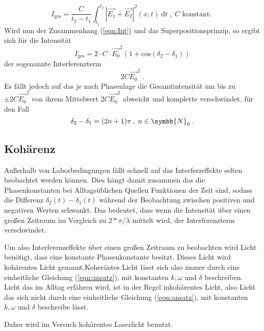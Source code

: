 \begin{equation}
    I_\text{ges} = \frac{C}{t_2 - t_1} \int^{t_2}_{t_1} |\vec{E_1} + \vec{E_2}|^2 (x, t) \: \text{d}t 
    \; , \; C \text{ konstant. } 
\end{equation}
\noindent
Wird nun der Zusammenhang (\ref{eqn:Int}) und das Superpositionsprinzip, so ergibt sich für die Intensität 
\begin{equation*}
    I_\text{ges} = 2 \cdot C \cdot \vec{E_0}^2 (1 + \text{cos}(\delta_2 - \delta_1))
\end{equation*}
\noindent 
der sogenannte Interferenzterm 
\begin{equation*}
    2 C \vec{E_0}^2 \; .
\end{equation*}
\noindent 
Es fällt jedoch auf das je nach Phasenlage die Gesamtintensität um bis zu $\pm 2 C \vec{E_0}^2$ von ihrem Mittelwert $2 C \vec{E_0}^2$ abweicht und komplette verschwindet, für
den Fall 
\begin{equation}
    \delta_2 - \delta_1 = (2n + 1)\pi \: , \; n \in \symbb{N}_0 \; .
\end{equation}

\subsection{Kohärenz}
Außerhalb von Laborbedingungen fällt schnell auf das Interferzeffekte selten beobachtet werden können. Dies hängt damit zusammen das die Phasenkonstanten bei Alltagsüblichen Quellen 
Funktionen der Zeit sind, sodass die Differenz $\delta_2(t) - \delta_1(t)$ während der Beobachtung zwischen positiven und negativen Werten schwankt. Das bedeutet, dass wenn die
Intensität über einen großen Zeitraum im Vergleich zu $2*\pi/\lambda$ mittelt wird, der Interferenzterm verschwindet.

Um also Interferenzeffekte über einen großen Zeitraum zu beobachten wird Licht benötigt, dass eine konstante Phasenkonstante besitzt. Dieses Licht wird kohärentes Licht genannt.Koheräntes
Licht lässt sich also immer durch eine einheitliche Gleichung (\ref{eqn:ansatz}), mit konstanten $k, \omega \text{ und } \delta$ beschreiben. Licht das im Alltag erfähren wird, ist in der Regel inkohärentes Licht,
also Licht das sich nicht durch eine einheitliche Gleichung (\ref{eqn:ansatz}), mit konstanten $k, \omega \text{ und } \delta$ beschreibe lässt.
\noindent

Daher wird im Versuch kohärentes Laserlicht benutzt.

